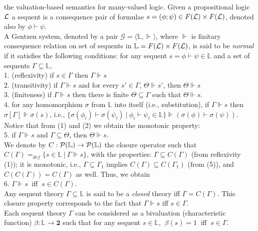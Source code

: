 \documentclass[10pt,twocolumn]{article}
\newcommand{\A}{\mathcal{A}} \newcommand{\B}{\mathcal{B}}
\newcommand{\G}{\mathcal{G}} \renewcommand{\H}{\mathcal{H}}
\begin{document}
the valuation-based semantics for many-valued logic.
Given a propositional logic $\L$  a
sequent
 is a consequence pair of formulae $ s = (\phi ; \psi) \in F(\L) \times F(\L)$, denoted also by $\phi \vdash
 \psi$. \\A Gentzen system, denoted by a pair $\G = \langle \mathbb{L}, \Vdash
 \rangle$, where $\Vdash$ is finitary consequence relation on set of sequents in $\mathbb{L} = F(\L) \times F(\L)$,
 is said to be \emph{normal} if it satisfies the following
 conditions: for any sequent $s = \phi \vdash
 \psi \in \mathbb{L}$ and a set of
 sequents $\Gamma \subseteq \mathbb{L}$, \\
1. (reflexivity) if $s \in \Gamma$ then $\Gamma \Vdash s$\\
 2. (transitivity) if $\Gamma \Vdash s$ and for every $s' \in
 \Gamma$, $\Theta \Vdash s'$, then $\Theta \Vdash s$\\
 3. (finiteness) if $\Gamma \Vdash s$ then there is finite $\Theta
 \subseteq\Gamma$ such that $\Theta \Vdash s$.\\
 4. for any homomorphism $\sigma$ from $\mathbb{L}$ into itself
 (i.e., substitution), if $\Gamma \Vdash s$ then $\sigma[\Gamma] \Vdash
 \sigma(s)$, i.e., $\{\sigma(\phi_i) \vdash \sigma(\psi_i)~|~\phi_i \vdash
 \psi_i \in \mathbb{L}\} \Vdash (\sigma(\phi) \vdash \sigma(\psi))$.\\
 Notice that from (1) and (2) we obtain the monotonic property:\\
 5.  if  $\Gamma \Vdash s$ and $\Gamma
 \subseteq\Theta$, then $\Theta \Vdash s$.\\
 We denote by $C:\P(\mathbb{L})\rightarrow \P(\mathbb{L})$ the
 closure operator such that $C(\Gamma) =_{def} \{ s \in \mathbb{L}~|~\Gamma \Vdash
 s\}$, with the properties: $\Gamma \subseteq C(\Gamma)$ (from
 reflexivity (1)); it is monotonic, i.e., $\Gamma \subseteq \Gamma_1$ implies
 $C(\Gamma) \subseteq C(\Gamma_1)$ (from  (5)), and  $C(C(\Gamma)) = C(\Gamma)$ as well. Thus, we obtain \\
 6. $\Gamma \Vdash s ~$ iff $~s \in C(\Gamma)$.\\
 Any sequent theory $\Gamma \subseteq \mathbb{L}$ is said to be a \emph{closed}
 theory iff $\Gamma = C(\Gamma)$. This closure property corresponds to the
 fact that $\Gamma \Vdash s$ iff $s \in \Gamma$.\\
 Each sequent theory $\Gamma$ can be considered as a bivaluation (characteristic function) $\beta:\mathbb{L} \rightarrow
 \textbf{2}$ such that for any sequent $s \in \mathbb{L}$, $~\beta(s)
 = 1~$ iff $~s \in \Gamma$.
\end{document}

